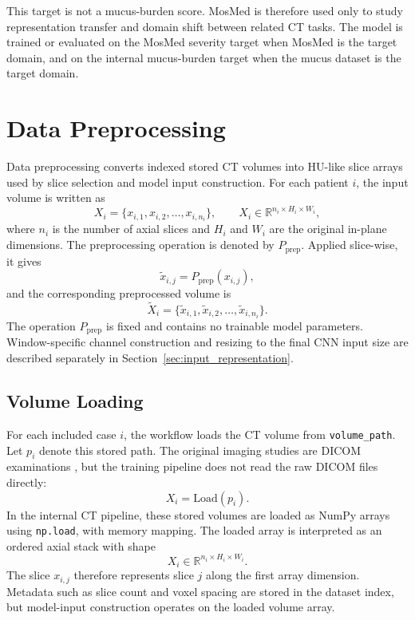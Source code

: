 This target is not a mucus-burden score. MosMed is therefore used only to study representation transfer and domain shift between related CT tasks. The model is trained or evaluated on the MosMed severity target when MosMed is the target domain, and on the internal mucus-burden target when the mucus dataset is the target domain.




\section{Data Preprocessing}
\label{sec:data_preprocessing}

Data preprocessing converts indexed stored CT volumes into HU-like slice arrays used by slice selection and model input construction. For each patient \(i\), the input volume is written as
\[
X_i = \{x_{i,1}, x_{i,2}, \dots, x_{i,n_i}\},
\qquad
X_i \in \mathbb{R}^{n_i \times H_i \times W_i},
\]
where \(n_i\) is the number of axial slices and \(H_i\) and \(W_i\) are the original in-plane dimensions. The preprocessing operation is denoted by \(P_{\mathrm{prep}}\). Applied slice-wise, it gives
\[
\tilde{x}_{i,j} = P_{\mathrm{prep}}(x_{i,j}),
\]
and the corresponding preprocessed volume is
\[
\tilde{X}_i =
\{\tilde{x}_{i,1}, \tilde{x}_{i,2}, \dots, \tilde{x}_{i,n_i}\}.
\]
The operation \(P_{\mathrm{prep}}\) is fixed and contains no trainable model parameters. Window-specific channel construction and resizing to the final CNN input size are described separately in Section~\ref{sec:input_representation}.


\subsection{Volume Loading}
\label{sec:volume_loading}

For each included case \(i\), the workflow loads the CT volume from \texttt{volume\_path}. Let \(p_i\) denote this stored path. The original imaging studies are DICOM examinations \cite{dicomstandard2026}, but the training pipeline does not read the raw DICOM files directly:
\[
X_i = \mathrm{Load}(p_i).
\]
In the internal CT pipeline, these stored volumes are loaded as NumPy arrays using \texttt{np.load}, with memory mapping. The loaded array is interpreted as an ordered axial stack with shape
\[
X_i \in \mathbb{R}^{n_i \times H_i \times W_i}.
\]
The slice \(x_{i,j}\) therefore represents slice \(j\) along the first array dimension. Metadata such as slice count and voxel spacing are stored in the dataset index, but model-input construction operates on the loaded volume array.


